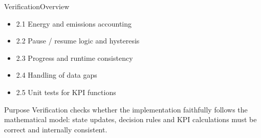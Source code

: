 \begin{frame}{Verification}{Overview}
  \begin{itemize}
    \item 2.1 Energy and emissions accounting
    \item 2.2 Pause / resume logic and hysteresis
    \item 2.3 Progress and runtime consistency
    \item 2.4 Handling of data gaps
    \item 2.5 Unit tests for KPI functions
  \end{itemize}
  \vspace{0.5cm}
  \begin{block}{Purpose}
    Verification checks whether the implementation faithfully follows the
    mathematical model: state updates, decision rules and KPI calculations
    must be correct and internally consistent.
  \end{block}
\end{frame}







